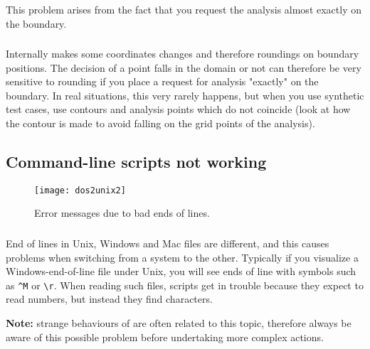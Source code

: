 \subsubsection{\question}

This problem arises from the fact that you request the analysis almost exactly on the boundary.



\subsubsection{\answer}

Internally \diva makes some coordinates changes and therefore roundings on boundary positions. The decision of a point falls in the domain or not can therefore be very sensitive
to rounding if you place a request for analysis "exactly" on the boundary. In real situations, this very rarely happens, but when you use synthetic test cases, use contours and analysis points which do not coincide (look at  how the contour is made to avoid falling on the grid points of the analysis).



\subsection{Command-line scripts not working}


\begin{figure}[htpb]
\centering
\texttt{[image: dos2unix2]}
\caption{Error messages due to bad ends of lines. \label{fig:error_dos2unix}}
\end{figure}

\subsubsection{\question}

End of lines in Unix,  Windows and Mac files are different, and this causes problems when switching from a system to the other. Typically if you visualize a Windows-end-of-line file under Unix, you will see ends of line with symbols such as \verb|^M| or \verb|\r|. When reading such files, scripts get in trouble because they expect to read numbers, but instead they find characters.

\textbf{Note:} strange behaviours of \diva are often related to this topic, therefore always be aware of this possible problem before undertaking more complex actions.

